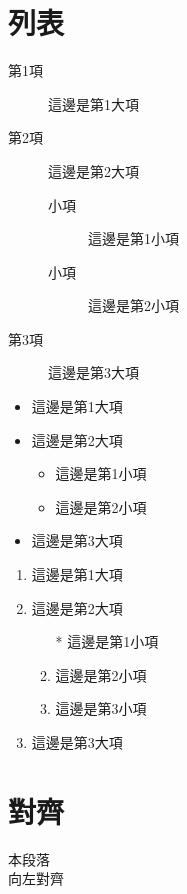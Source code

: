 \section{列表} \label{sec_item}

\begin{description} \item[第1項] 這邊是第1大項
    \item[第2項] 這邊是第2大項
        \begin{description}
            \item[小項] 這邊是第1小項
            \item[小項] 這邊是第2小項
        \end{description}
    \item[第3項] 這邊是第3大項
\end{description}

\begin{itemize}
    \item 這邊是第1大項
    \item 這邊是第2大項
        \begin{itemize}
            \item 這邊是第1小項
            \item 這邊是第2小項
        \end{itemize}
    \item 這邊是第3大項
\end{itemize}

\begin{enumerate}
    \item 這邊是第1大項
    \item 這邊是第2大項
        \begin{enumerate}
            \item[*] 這邊是第1小項
            \item 這邊是第2小項
            \item 這邊是第3小項
        \end{enumerate}
    \item 這邊是第3大項
\end{enumerate}

\newpage

\section{對齊}
\begin{flushleft}
    本段落\\
    向左對齊
\end{flushleft}

